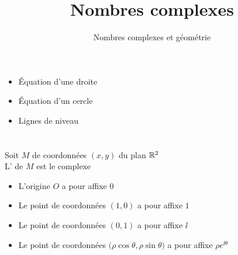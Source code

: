 






\title{{\bf Nombres complexes}}
\subtitle{Nombres complexes et géométrie}


\begin{frame}
  
  \debutmontitre

  \pause

{\footnotesize
\hfill
{}
\begin{minipage}{0.6\textwidth}
  \begin{itemize}
    \item<3-> Équation d'une droite
    \item<4-> Équation d'un cercle
    \item<5-> Lignes de niveau
  \end{itemize}
\end{minipage}
}

\end{frame}

\setcounter{framenumber}{0}

\section{}

\begin{frame}
Soit $M$ de coordonnées $(x,y)$ du plan $\mathbb{R}^2$ \\ 
L' de $M$ est le complexe 

\bigskip
\pause
\begin{exemple}
\begin{itemize}
\item L'origine $O$ a pour affixe $0$
\pause
\item Le point de coordonnées $(1,0)$ a pour affixe $1$
\pause
\item Le point de coordonnées $(0,1)$ a pour affixe $\ii$
\pause
\item Le point de coordonnées $\big(\rho\cos\theta,\rho\sin\theta\big )$ a pour affixe $\rho e^{\ii \theta}$
\end{itemize}
\end{exemple}

\end{frame}


